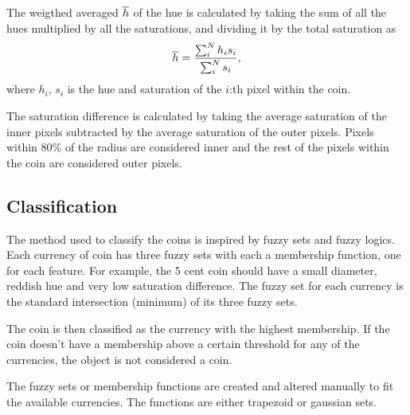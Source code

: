 \documentclass[report.tex]{subfile}
\begin{document}
The weigthed averaged $\overline{h}$ of the hue is calculated by taking the sum of
all the hues multiplied by all the saturations, and dividing it by the total
saturation as
\begin{equation*}
    \overline{h} = \frac{\sum_i^N h_i s_i}{\sum_i^N s_i},
\end{equation*}
where $h_i$, $s_i$ is the hue and saturation of the $i$:th pixel within the
coin.

The saturation difference is calculated by taking the average saturation of the
inner pixels subtracted by the average saturation of the outer pixels. Pixels
within 80\% of the radius are considered inner and the rest of the pixels
within the coin are considered outer pixels.

\subsection{Classification}
The method used to classify the coins is inspired by fuzzy sets and fuzzy
logics. Each currency of coin has three fuzzy sets with each a membership
function, one for each feature. For example, the 5 cent coin should have a
small diameter, reddish hue and very low saturation difference. The fuzzy set
for each currency is the standard intersection (minimum) of its three fuzzy
sets.

The coin is then classified as the currency with the highest membership. If the
coin doesn't have a membership above a certain threshold for any of the
currencies, the object is not considered a coin.

The fuzzy sets or membership functions are created and altered manually to fit
the available currencies. The functions are either trapezoid or gaussian sets.
\end{document}
